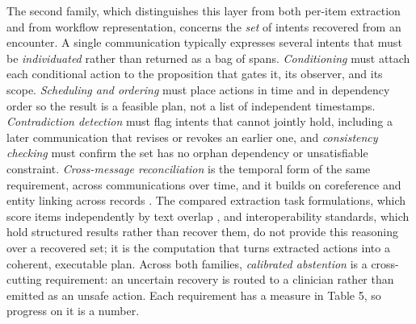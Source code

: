 \documentclass[3p,twocolumn]{elsarticle}
\begin{document}
The second family, which distinguishes this layer from both per-item extraction and from workflow representation, concerns the \emph{set} of intents recovered from an encounter. A single communication typically expresses several intents that must be \emph{individuated} rather than returned as a bag of spans. \emph{Conditioning} must attach each conditional action to the proposition that gates it, its observer, and its scope. \emph{Scheduling and ordering} must place actions in time and in dependency order so the result is a feasible plan, not a list of independent timestamps. \emph{Contradiction detection} must flag intents that cannot jointly hold, including a later communication that revises or revokes an earlier one, and \emph{consistency checking} must confirm the set has no orphan dependency or unsatisfiable constraint. \emph{Cross-message reconciliation} is the temporal form of the same requirement, across communications over time, and it builds on coreference and entity linking across records \cite{ref50}. The compared extraction task formulations, which score items independently by text overlap \cite{ref32}, and interoperability standards, which hold structured results rather than recover them, do not provide this reasoning over a recovered set; it is the computation that turns extracted actions into a coherent, executable plan. Across both families, \emph{calibrated abstention} is a cross-cutting requirement: an uncertain recovery is routed to a clinician rather than emitted as an unsafe action. Each requirement has a measure in Table 5, so progress on it is a number.
\end{document}
